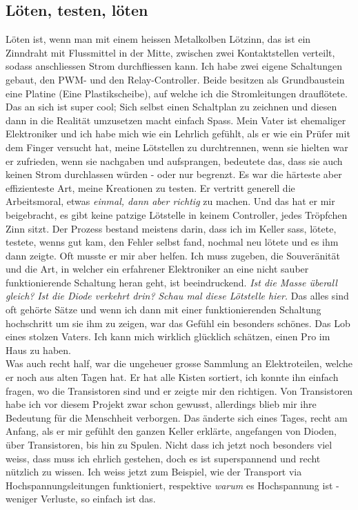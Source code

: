 \documentclass[12pt,titlepage,a4paper]{article}
\begin{document}
\subsection{Löten, testen, löten}
Löten ist, wenn man mit einem heissen Metalkolben Lötzinn, das ist ein Zinndraht mit Flussmittel in der Mitte, zwischen zwei Kontaktstellen verteilt, sodass anschliessen Strom durchfliessen kann. Ich habe zwei eigene Schaltungen gebaut, den PWM- und den Relay-Controller. Beide besitzen als Grundbaustein eine Platine (Eine Plastikscheibe), auf welche ich die Stromleitungen drauflötete. Das an sich ist super cool; Sich selbst einen Schaltplan zu zeichnen und diesen dann in die Realität umzusetzen macht einfach Spass. Mein Vater ist ehemaliger Elektroniker und ich habe mich wie ein Lehrlich gefühlt, als er wie ein Prüfer mit dem Finger versucht hat, meine Lötstellen zu durchtrennen, wenn sie hielten war er zufrieden, wenn sie nachgaben und aufsprangen, bedeutete das, dass sie auch keinen Strom durchlassen würden - oder nur begrenzt. Es war die härteste aber effizienteste Art, meine Kreationen zu testen. Er vertritt generell die Arbeitsmoral, etwas \textit{einmal, dann aber richtig} zu machen. Und das hat er mir beigebracht, es gibt keine patzige Lötstelle in keinem Controller, jedes Tröpfchen Zinn sitzt. Der Prozess bestand meistens darin, dass ich im Keller sass, lötete, testete, wenns gut kam, den Fehler selbst fand, nochmal neu lötete und es ihm dann zeigte. Oft musste er mir aber helfen. Ich muss zugeben, die Souveränität und die Art, in welcher ein erfahrener Elektroniker an eine nicht sauber funktionierende Schaltung heran geht, ist beeindruckend. \textit{Ist die Masse überall gleich?} \textit{Ist die Diode verkehrt drin?} \textit{Schau mal diese Lötstelle hier.} Das alles sind oft gehörte Sätze und wenn ich dann mit einer funktionierenden Schaltung hochschritt um sie ihm zu zeigen, war das Gefühl ein besonders schönes. Das Lob eines stolzen Vaters. Ich kann mich wirklich glücklich schätzen, einen Pro im Haus zu haben.\\
Was auch recht half, war die ungeheuer grosse Sammlung an Elektroteilen, welche er noch aus alten Tagen hat. Er hat alle Kisten sortiert, ich konnte ihn einfach fragen, wo die Transistoren sind und er zeigte mir den richtigen. Von Transistoren habe ich vor diesem Projekt zwar schon gewusst, allerdings blieb mir ihre Bedeutung für die Menschheit verborgen. Das änderte sich eines Tages, recht am Anfang, als er mir gefühlt den ganzen Keller erklärte, angefangen von Dioden, über Transistoren, bis hin zu Spulen. Nicht dass ich jetzt noch besonders viel weiss, dass muss ich ehrlich gestehen, doch es ist superspannend und recht nützlich zu wissen. Ich weiss jetzt zum Beispiel, wie der Transport via Hochspannungsleitungen funktioniert, respektive \textit{warum} es Hochspannung ist - weniger Verluste, so einfach ist das.\\
\end{document}
